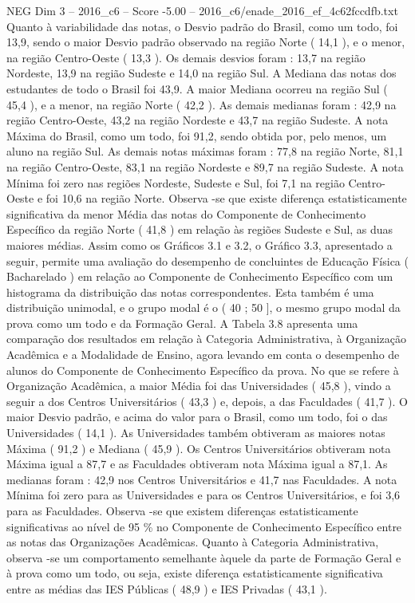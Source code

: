 \begin{textsample}{NEG Dim 3 – 2016\_c6 – Score -5.00 – 2016\_c6/enade\_2016\_ef\_4c62fccdfb.txt}
Quanto à variabilidade das notas, o Desvio padrão do Brasil, como um todo, foi 13,9, sendo o maior Desvio padrão observado na região Norte ( 14,1 ), e o menor, na região Centro-Oeste ( 13,3 ).
Os demais desvios foram : 13,7 na região Nordeste, 13,9 na região Sudeste e 14,0 na região Sul.
A Mediana das notas dos estudantes de todo o Brasil foi 43,9.
A maior Mediana ocorreu na região Sul ( 45,4 ), e a menor, na região Norte ( 42,2 ).
As demais medianas foram : 42,9 na região Centro-Oeste, 43,2 na região Nordeste e 43,7 na região Sudeste.
A nota Máxima do Brasil, como um todo, foi 91,2, sendo obtida por, pelo menos, um aluno na região Sul.
As demais notas máximas foram : 77,8 na região Norte, 81,1 na região Centro-Oeste, 83,1 na região Nordeste e 89,7 na região Sudeste.
A nota Mínima foi zero nas regiões Nordeste, Sudeste e Sul, foi 7,1 na região Centro-Oeste e foi 10,6 na região Norte.
Observa -se que existe diferença estatisticamente significativa da menor Média das notas do Componente de Conhecimento Específico da região Norte ( 41,8 ) em relação às regiões Sudeste e Sul, as duas maiores médias.
Assim como os Gráficos 3.1 e 3.2, o Gráfico 3.3, apresentado a seguir, permite uma avaliação do desempenho de concluintes de Educação Física ( Bacharelado ) em relação ao Componente de Conhecimento Específico com um histograma da distribuição das notas correspondentes.
Esta também é uma distribuição unimodal, e o grupo modal é o ( 40 ; 50 ], o mesmo grupo modal da prova como um todo e da Formação Geral.
A Tabela 3.8 apresenta uma comparação dos resultados em relação à Categoria Administrativa, à Organização Acadêmica e a Modalidade de Ensino, agora levando em conta o desempenho de alunos do Componente de Conhecimento Específico da prova.
No que se refere à Organização Acadêmica, a maior Média foi das Universidades ( 45,8 ), vindo a seguir a dos Centros Universitários ( 43,3 ) e, depois, a das Faculdades ( 41,7 ).
O maior Desvio padrão, e acima do valor para o Brasil, como um todo, foi o das Universidades ( 14,1 ).
As Universidades também obtiveram as maiores notas Máxima ( 91,2 ) e Mediana ( 45,9 ).
Os Centros Universitários obtiveram nota Máxima igual a 87,7 e as Faculdades obtiveram nota Máxima igual a 87,1.
As medianas foram : 42,9 nos Centros Universitários e 41,7 nas Faculdades.
A nota Mínima foi zero para as Universidades e para os Centros Universitários, e foi 3,6 para as Faculdades.
Observa -se que existem diferenças estatisticamente significativas ao nível de 95 \% no Componente de Conhecimento Específico entre as notas das Organizações Acadêmicas.
Quanto à Categoria Administrativa, observa -se um comportamento semelhante àquele da parte de Formação Geral e à prova como um todo, ou seja, existe diferença estatisticamente significativa entre as médias das IES Públicas ( 48,9 ) e IES Privadas ( 43,1 ).

\end{textsample}
